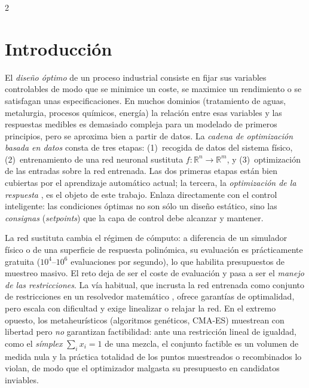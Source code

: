 \documentclass[5p,times,authoryear]{sciarticle}
\begin{document}
\begin{multicols}{2}

\section{Introducción}
El \emph{diseño óptimo} de un proceso industrial consiste en fijar sus
variables controlables de modo que se minimice un coste, se maximice un
rendimiento o se satisfagan unas especificaciones. En muchos dominios
(tratamiento de aguas, metalurgia, procesos químicos, energía) la relación
entre esas variables y las respuestas medibles es demasiado compleja para un
modelado de primeros principios, pero se aproxima bien a partir de datos.
La \emph{cadena de optimización basada en datos} consta de tres etapas:
(1)~recogida de datos del sistema físico, (2)~entrenamiento de una red
neuronal sustituta $f\colon\mathbb{R}^n\to\mathbb{R}^m$, y (3)~optimización de
las entradas sobre la red entrenada. Las dos primeras etapas están bien
cubiertas por el aprendizaje automático actual; la tercera, la
\emph{optimización de la respuesta} \citep{Myers2016,Derringer1980}, es el
objeto de este trabajo. Enlaza directamente con el control inteligente: las
condiciones óptimas no son sólo un diseño estático, sino las \emph{consignas}
(\emph{setpoints}) que la capa de control debe alcanzar y mantener.

La red sustituta cambia el régimen de cómputo: a diferencia de un simulador
físico o de una superficie de respuesta polinómica, su evaluación es
prácticamente gratuita ($10^4$--$10^6$ evaluaciones por segundo), lo que
habilita presupuestos de muestreo masivo. El reto deja de ser el coste de
evaluación y pasa a ser el \emph{manejo de las restricciones}. La vía
habitual, que incrusta la red entrenada como conjunto de restricciones en un
resolvedor matemático \citep{Ceccon2022OMLT,Parker2024NNsurrogates},
ofrece garantías de optimalidad, pero escala con dificultad y exige
linealizar o relajar la red. En el extremo opuesto, los metaheurísticos
(algoritmos genéticos, CMA-ES) muestrean con libertad pero \emph{no}
garantizan factibilidad: ante una restricción lineal de igualdad, como el
\emph{símplex} $\sum_i x_i = 1$ de una mezcla, el conjunto factible es un
volumen de medida nula y la práctica totalidad de los puntos muestreados o
recombinados lo violan, de modo que el optimizador malgasta su presupuesto en
candidatos inviables.


\end{multicols}
\end{document}

